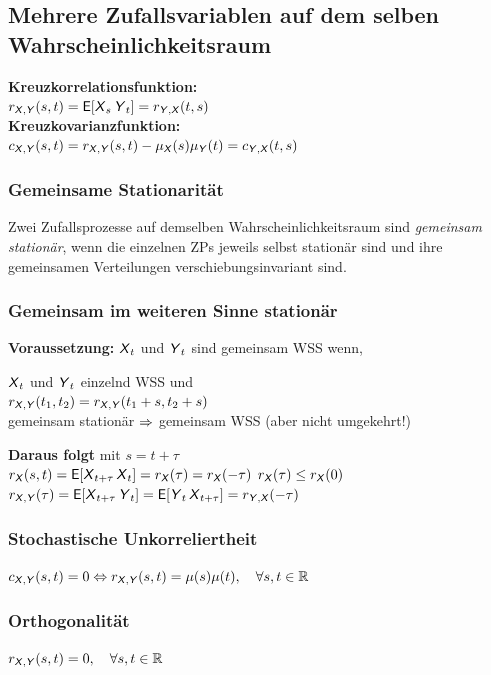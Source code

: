 \documentclass[german,color,6pt]{latex4ei/latex4ei_sheet}
\begin{document}
\begin{sectionbox}
	\subsection{Mehrere Zufallsvariablen auf dem selben Wahrscheinlichkeitsraum}
	\begin{emphbox}
		\raggedright
		\textbf{Kreuzkorrelationsfunktion:} \\ $r_{\X,\Y}(s,t) = \E[\X_s \Y_t] = r_{\Y,\X}(t,s)$\\
		\textbf{Kreuzkovarianzfunktion:}\\ $c_{\X,\Y}(s,t) = r_{\X,\Y}(s,t) - \mu_{\X}(s)\mu_{\Y}(t) = c_{\Y,\X}(t,s)$
	\end{emphbox}
	
	\subsubsection{Gemeinsame Stationarität}
	Zwei Zufallsprozesse auf demselben Wahrscheinlichkeitsraum sind \emph{gemeinsam stationär}, wenn die einzelnen ZPs jeweils selbst stationär sind und ihre gemeinsamen Verteilungen verschiebungsinvariant sind.
	
	\subsubsection{Gemeinsam im weiteren Sinne stationär}
	\textbf{Voraussetzung:} $\X_t$ und $\Y_t$ sind gemeinsam WSS wenn,\\
	
	\begin{emphbox}
		\raggedright
		$\X_t$ und $\Y_t$ einzelnd WSS und\\
		$r_{\X,\Y}(t_1,t_2) = r_{\X,\Y}(t_1 + s,t_2 + s)$\\
		gemeinsam stationär $\Ra$ gemeinsam WSS (aber nicht umgekehrt!)
	\end{emphbox}
	\textbf{Daraus folgt} mit $s = t + \tau$\\
	$r_{\X}(s,t) = \E[\X_{t+\tau} \X_t] = r_{\X}(\tau) = r_{\X}(-\tau)$ \qquad $r_{\X}(\tau) \le r_{\X}(0)$\\
	$r_{\X,\Y}(\tau)=\E[\X_{t+\tau} \Y_t]=\E[\Y_t \X_{t+\tau}]=r_{\Y,\X}(-\tau)$
	\subsubsection{Stochastische Unkorreliertheit}
	$c_{\X,\Y}(s,t) = 0 \Leftrightarrow r_{\X,\Y}(s,t) = \mu(s)\mu(t), \quad \forall s,t \in \R$
	\subsubsection{Orthogonalität}
	$r_{\X,\Y}(s,t) = 0, \quad \forall s,t \in \R$
\end{sectionbox}
\end{document}
